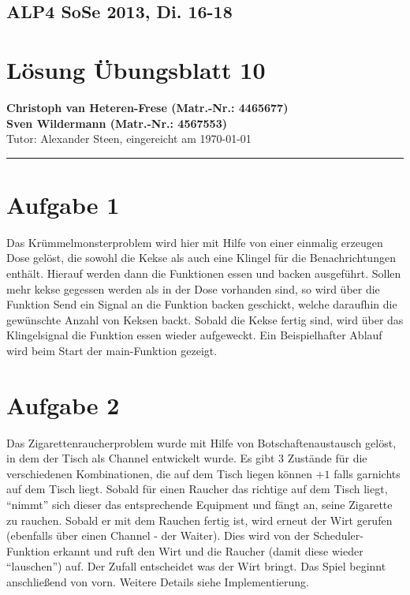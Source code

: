 \documentclass[11pt,a4paper,DIV=10,]{scrartcl}
\begin{document}
\subsection*{ALP4 SoSe 2013, Di. 16-18}
\section*{Lösung Übungsblatt 10}
\textbf{Christoph van Heteren-Frese (Matr.-Nr.: 4465677)} \\ 
\textbf{Sven Wildermann (Matr.-Nr.: 4567553)}\\
Tutor: Alexander Steen, eingereicht am \today\\
\hrule
\section*{Aufgabe 1}

Das Krümmelmonsterproblem wird hier mit Hilfe von einer einmalig erzeugen Dose gelöst, die sowohl die 
Kekse als auch eine Klingel für die Benachrichtungen enthält. Hierauf werden dann die Funktionen essen
und backen ausgeführt. Sollen mehr kekse gegessen werden als in der Dose vorhanden sind, so wird über die 
Funktion Send ein Signal an die Funktion backen geschickt, welche daraufhin die gewünschte Anzahl von Keksen backt.
Sobald die Kekse fertig sind, wird über das Klingelsignal die Funktion essen wieder aufgeweckt. 
Ein Beispielhafter Ablauf wird beim Start der main-Funktion gezeigt.  \\


\section*{Aufgabe 2}
Das Zigarettenraucherproblem wurde mit Hilfe von Botschaftenaustausch gelöst, in dem der Tisch als Channel entwickelt wurde. Es gibt 3 Zustände für die verschiedenen Kombinationen, die auf dem Tisch liegen können $+1$ falls garnichts auf dem Tisch liegt. 
Sobald für einen Raucher das richtige auf dem Tisch liegt, ``nimmt'' sich dieser das entsprechende Equipment und fängt an, seine Zigarette zu rauchen.
Sobald er mit dem Rauchen fertig ist, wird erneut der Wirt gerufen (ebenfalls über einen Channel - der Waiter). Dies wird von der Scheduler-Funktion erkannt und ruft den Wirt und die Raucher (damit diese wieder ``lauschen'') auf. 
Der Zufall entscheidet was der Wirt bringt. Das Spiel beginnt anschließend von vorn. Weitere Details siehe Implementierung. \\
\end{document}
